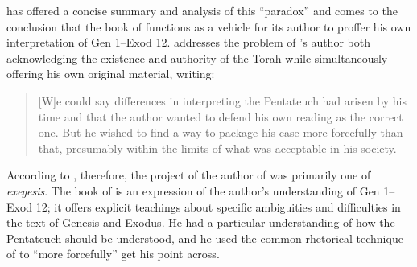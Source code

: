 \vanderkam has offered a concise summary and analysis of this ``\psgraphical paradox'' and comes to the conclusion that the book of \jub functions as a vehicle for its author to proffer his own interpretation of Gen 1--Exod 12. \vanderkam addresses the problem of \jub's author both acknowledging the existence and authority of the Torah while simultaneously offering his own original material, writing:

\begin{quote}
    [W]e could say differences in interpreting the Pentateuch had arisen by his time and that the author wanted to defend his own reading as the correct one. But he wished to find a way to package his case more forcefully than that, presumably within the limits of what was acceptable in his society.\autocite[28]{vanderkam_metso-etal2010}
\end{quote}

\noindent
According to \vanderkam, therefore, the project of the author of \jub was primarily one of \emph{exegesis}. The book of \jub is an expression of the author's understanding of Gen 1--Exod 12; it offers explicit teachings about specific ambiguities and difficulties in the text of Genesis and Exodus. He had a particular understanding of how the Pentateuch should be understood, and he used the common rhetorical technique of \psy to ``more forcefully'' get his point across.%
    \autocite[28]{vanderkam_metso-etal2010}

